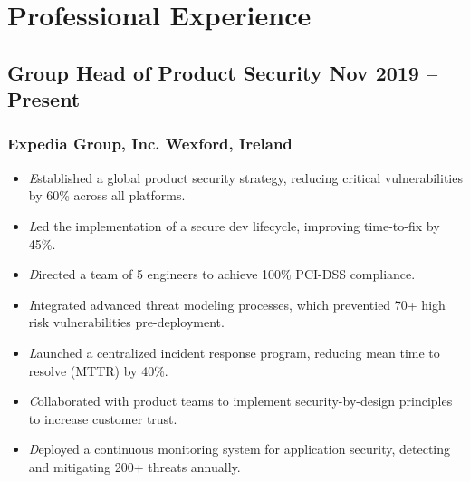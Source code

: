 
\section{Professional Experience}

\subsection{Group Head of Product Security \texorpdfstring{\hspace*{\fill}}{\hspace*{\fill}} \normalfont Nov 2019 -- Present}
\subsubsection{Expedia Group, Inc. \texorpdfstring{\hspace*{\fill}}{\hspace*{\fill}} \normalfont Wexford, Ireland} \vspace{0.15cm}

\begin{itemize}
    \item[\textrightarrow] \textit Established a global product security strategy, reducing critical vulnerabilities by 60\% across all platforms. \vspace{0.1cm}
    \item[\textrightarrow] \textit Led the implementation of a secure dev lifecycle, improving time-to-fix by 45\%. \vspace{0.1cm}
    \item[\textrightarrow] \textit Directed a team of 5 engineers to achieve 100\% PCI-DSS compliance. \vspace{0.1cm}
    \item[\textrightarrow] \textit Integrated advanced threat modeling processes, which preventied 70+ high risk vulnerabilities pre-deployment. \vspace{0.1cm}
    \item[\textrightarrow] \textit Launched a centralized incident response program, reducing mean time to resolve (MTTR) by 40\%. \vspace{0.1cm}
    \item[\textrightarrow] \textit Collaborated with product teams to implement security-by-design principles to increase customer trust. \vspace{0.1cm}
    \item[\textrightarrow] \textit Deployed a continuous monitoring system for application security, detecting and mitigating 200+ threats annually.
\end{itemize}

